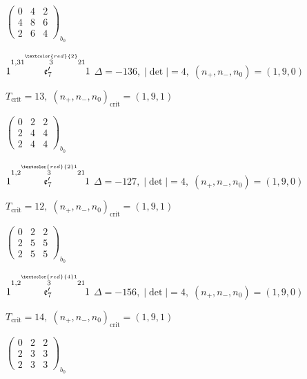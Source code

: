\documentclass[10pt]{article}
\begin{document}
\hspace{2em}$\left(\begin{smallmatrix}0 & 4 & 2 \\ 4 & 8 & 6 \\ 2 & 6 & 4\end{smallmatrix}\right)_{\!b_0}$

\smallskip

$1\overset{1,31\overset{\textcolor{red}{2}}{3}21}{\mathfrak{e}_7'}1$ \quad $\Delta=-136,\; |\det|=4,\; (n_+,n_-,n_0)=(1,9,0)$

\hspace{1em}$T_{\text{crit}}=13,\; (n_+,n_-,n_0)_{\text{crit}}=(1,9,1)$

\hspace{2em}$\left(\begin{smallmatrix}0 & 2 & 2 \\ 2 & 4 & 4 \\ 2 & 4 & 4\end{smallmatrix}\right)_{\!b_0}$

\smallskip

$1\overset{1,2\overset{\textcolor{red}{2}1}{3}21}{\mathfrak{e}_7'}1$ \quad $\Delta=-127,\; |\det|=4,\; (n_+,n_-,n_0)=(1,9,0)$

\hspace{1em}$T_{\text{crit}}=12,\; (n_+,n_-,n_0)_{\text{crit}}=(1,9,1)$

\hspace{2em}$\left(\begin{smallmatrix}0 & 2 & 2 \\ 2 & 5 & 5 \\ 2 & 5 & 5\end{smallmatrix}\right)_{\!b_0}$

$1\overset{1,2\overset{\textcolor{red}{4}1}{3}21}{\mathfrak{e}_7'}1$ \quad $\Delta=-156,\; |\det|=4,\; (n_+,n_-,n_0)=(1,9,0)$

\hspace{1em}$T_{\text{crit}}=14,\; (n_+,n_-,n_0)_{\text{crit}}=(1,9,1)$

\hspace{2em}$\left(\begin{smallmatrix}0 & 2 & 2 \\ 2 & 3 & 3 \\ 2 & 3 & 3\end{smallmatrix}\right)_{\!b_0}$
\end{document}
